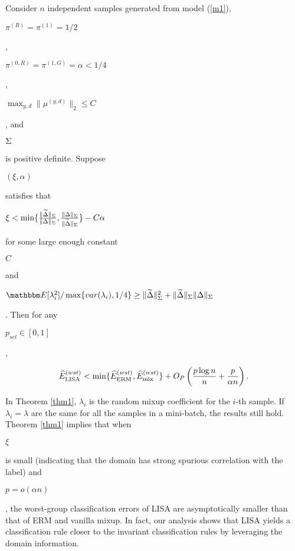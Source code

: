 \begin{theorem}
\label{thm1}

Consider $n$ independent samples generated from model (\ref{m1}),  \begin{small}$\pi^{(R)}=\pi^{(1)}=1/2$\end{small}, \begin{small}$\pi^{(0,R)}=\pi^{(1,G)}=\alpha<1/4$\end{small}, \begin{small}$\max_{y,d}\|\mu^{(y,d)}\|_2\leq C$\end{small}, and \begin{small}$\Sigma$\end{small} is positive definite. Suppose \begin{small}$(\xi,\alpha)$\end{small} satisfies that \begin{small}$\xi < \min\{\frac{\|\widetilde{\Delta}\|_{\Sigma}}{\|\Delta\|_{\Sigma}},\frac{\|\Delta\|_{\Sigma}}{\|\widetilde{\Delta}\|_{\Sigma}}\}-C\alpha$\end{small}
 for some large enough constant \begin{small}$C$\end{small} and \begin{small}$\E[\lam_i^2]/\max\{var(\lam_i),1/4\}\geq \|\widetilde{\Delta}\|_{\Sig}^2+\|\widetilde{\Delta}\|_{\Sig}\|\Delta\|_{\Sig}$\end{small}.
Then for any \begin{small}$p_{sel}\in[0,1]$\end{small},
\begin{small}
$$\widehat{E}_{\textup{LISA}}^{(wst)}< \min\{\widehat{E}_{\textup{ERM}}^{(wst)},\widehat{E}_{\textup{mix}}^{(wst)}\}+O_P\left(\frac{p\log n}{n}+\frac{p}{\alpha n}\right).$$
\end{small}
\end{theorem}
In Theorem \ref{thm1}, $\lambda_i$ is the random mixup coefficient for the $i$-th sample. If $\lambda_i=\lambda$ are the same for all the samples in a mini-batch, the results still hold. 
Theorem \ref{thm1} implies that when \begin{small}$\xi$\end{small} is small (indicating that the domain has strong spurious correlation with the label) and \begin{small}$p=o(\alpha n)$\end{small}, the worst-group classification errors of LISA are asymptotically smaller than that of ERM and vanilla mixup. {\color{black} In fact, our analysis shows that LISA yields a classification rule closer to the invariant classification rules by leveraging the domain information.}

